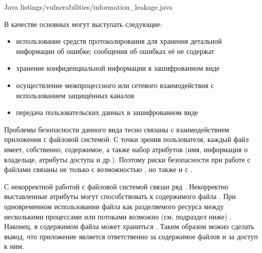 	{Java}
	{listings/vulnerabilities/information_leakage.java}

%
В качестве основных  могут выступать следующие:
\begin{itemize}
	
	\item использование средств протоколирования для хранения детальной информации об ошибке; сообщения об ошибках её не содержат

	\item хранение конфиденциальной информации в зашифрованном виде
	
	\item осуществление межпроцессного или сетевого взаимодействия с использованием защищённых каналов
	
	\item передача пользовательских данных в зашифрованном виде
\end{itemize}



%
%
Проблемы безопасности данного вида тесно связаны с взаимодействием приложения с файловой системой. 
%
С точки зрения пользователя, каждый файл имеет, собственно, содержимое, а также набор атрибутов (имя, информация о владельце, атрибуты доступа и др.). 
%
Поэтому риски безопасности при работе с файлами связаны не только с возможностью , но также и с  .

%
С некорректной работой с файловой системой связан ряд . 
%
Некорректно выставленные атрибуты могут способствовать к  содержимого файла . 
%
При одновременном использовании файла как разделяемого ресурса между несколькими процессами или потоками возможно  (см. подраздел ниже)  . 
%
Наконец, в содержимом файла может храниться  . 
%
Таким образом можно сделать вывод, что приложение является ответственно за содержимое файлов и за доступ к ним.

